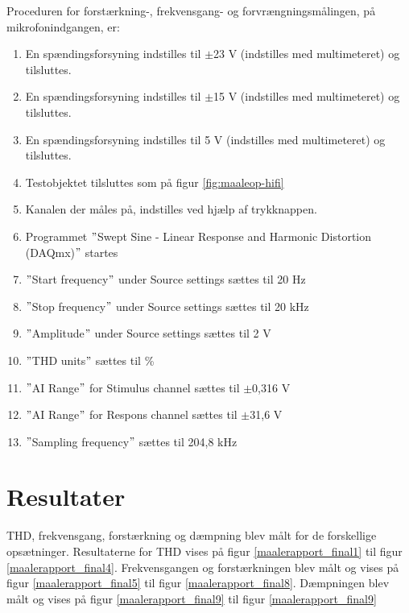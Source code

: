 Proceduren for forstærkning-, frekvensgang- og forvrængningsmålingen, på mikrofonindgangen, er:

\begin{enumerate}
\item En spændingsforsyning indstilles til $\pm$23 V (indstilles med multimeteret) og tilsluttes.
\item En spændingsforsyning indstilles til $\pm$15 V (indstilles med multimeteret) og tilsluttes.
\item En spændingsforsyning indstilles til 5 V (indstilles med multimeteret) og tilsluttes.
\item Testobjektet tilsluttes som på figur \ref{fig:maaleop-hifi}
\item Kanalen der måles på, indstilles ved hjælp af trykknappen.
\item Programmet $"$Swept Sine - Linear Response and Harmonic Distortion (DAQmx)$"$ startes
\item $"$Start frequency$"$ under Source settings sættes til 20 Hz
\item $"$Stop frequency$"$ under Source settings sættes til 20 kHz
\item $"$Amplitude$"$ under Source settings sættes til 2 V
\item $"$THD units$"$ sættes til \%
\item $"$AI Range$"$ for Stimulus channel sættes til $\pm$0,316 V
\item $"$AI Range$"$ for Respons channel sættes til $\pm$31,6 V
\item $"$Sampling frequency$"$ sættes til 204,8 kHz
\end{enumerate}

\section*{Resultater}

THD, frekvensgang, forstærkning og dæmpning blev målt for de forskellige opsætninger. Resultaterne for THD vises på figur \ref{maalerapport_final1} til figur \ref{maalerapport_final4}. Frekvensgangen og forstærkningen blev målt og vises på figur \ref{maalerapport_final5} til figur \ref{maalerapport_final8}. Dæmpningen blev målt og vises på figur \ref{maalerapport_final9} til figur \ref{maalerapport_final9}

